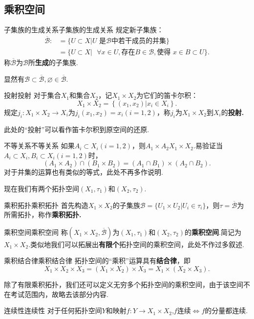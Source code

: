 \documentclass{ctexart}
\begin{document}
\subsection{乘积空间}
\begin{命题}{子集族的生成关系}{子集族的生成关系}
	规定新子集族：
	$$
	\begin{aligned}
		\overline{\mathscr{B}}:&=\lbrace U\subset X|U\text{ 是}\mathscr{B}\text{中若干成员的并集}\rbrace\\&=\lbrace U\subset X|\text{ }\forall x\in U,\text{存在}B\in\mathscr{B},\text{使得 }x\in B\subset U\rbrace.
	\end{aligned}
	$$ 称$\overline{\mathscr{B}}$为$ \mathscr{B}$所\textbf{生成}的子集族.
	
	显然有$\mathscr{B}\subset\overline{\mathscr{B}},\varnothing\in\overline{\mathscr{B}}.$
\end{命题}
\begin{定义}{投射}{投射}
	对于集合$X_1$和集合$X_2$，记$X_{1}\times X_{2}$为它们的笛卡尔积：
	$$
	X_1\times X_2=\left\{\left(x_1,x_2\right)|x_i\in X_i\right\}.
	$$规定$j_i:X_1\times X_2{\rightarrow}X_i$为$j_i(x_1,x_2)=x_i(i=1,2)$，称$j_i$为$X_{1}\times X_{2}$到$X_i$的\textbf{投射.}
\end{定义}
\begin{提示}
	此处的“投射”可以看作笛卡尔积到原空间的还原.
\end{提示}
\begin{命题}{不等关系}{不等关系}
	如果$ A_i\subset X_i(i=1,2)$，则$A_1\times A_2X_1\times X_2.$易验证当$A_i\subset X_i,B_i\subset X_i(i=1,2)$时，$$(A_1\times A_2)\cap(B_1\times B_2)=(A_1\cap B_1)\times(A_2\cap B_2). $$对于并集的运算也有类似的等式，此处不再多作说明.
\end{命题}
现在我们有两个拓扑空间$(X_{1},\tau_{1})$和$(X_{2},\tau_{2})$.
\begin{定义}{乘积拓扑}{乘积拓扑}
	首先构造$X_{1}\times X_{2}$的子集族$\mathscr{B}=\{U_1\times U_2|U_i\in\tau_i\}$，则$\tau = \overline{ \mathscr{B} }$为所需拓扑，称作\textbf{乘积拓扑.}
\end{定义}
\begin{定义}{乘积空间}{乘积空间}
	称$(X_1\times X_2,\overline{\mathscr{B}})$为$(X_{1},\tau_{1})$和$(X_{2},\tau_{2})$的\textbf{乘积空间}.简记为$X_1 \times X_2.$类似地我们可以拓展出\textbf{有限个}拓扑空间的乘积空间，此处不作过多叙述.
\end{定义}
\begin{定理}{乘积结合律}{乘积结合律}
	拓扑空间的“乘积”运算具有\textbf{结合律}，即$$
	X_1\times X_2\times X_3=(X_1\times X_2)\times X_3=X_1\times(X_2\times X_3).
	$$
\end{定理}
除了有限乘积拓扑，我们还可以定义无穷多个拓扑空间的乘积空间，由于该空间不在考试范围内，故略去该部分内容.
\begin{定理}{连续性}{连续性}
	对于任何拓扑空间$Y$和映射$f:Y\to X_1\times X_2$,$f$连续$\Longleftrightarrow f$的分量都连续.
\end{定理}
\end{document}
